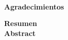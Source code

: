 \newpage{\pagestyle{empty}\cleardoublepage}


\begin{flushright}
\begin{minipage}{8cm}
    \noindent
        \small
\end{minipage}
\end{flushright}

\newpage{\pagestyle{empty}\cleardoublepage}

\newpage
\thispagestyle{empty} \textbf{}\normalsize
\\\\\\%
\textbf{\LARGE Agradecimientos}\\


\newpage{\pagestyle{empty}\cleardoublepage}

\newpage
\textbf{\LARGE Resumen}\\


\textbf{\LARGE Abstract}\\\\

